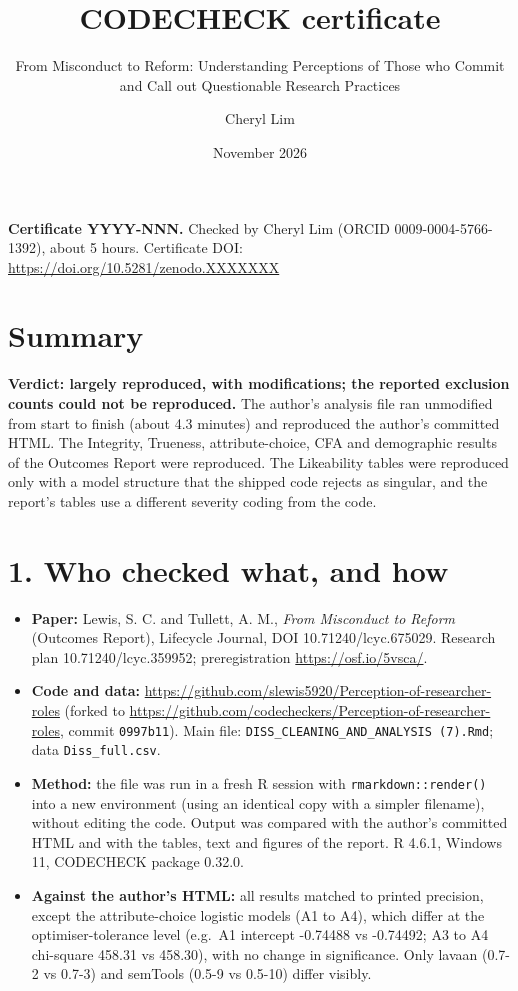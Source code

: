 \documentclass[
]{article}
\title{CODECHECK certificate}
\subtitle{From Misconduct to Reform: Understanding Perceptions of Those
who Commit and Call out Questionable Research Practices}
\author{Cheryl Lim}
\date{November 2026}
\providecommand{\tightlist}{%
  \setlength{\itemsep}{0pt}\setlength{\parskip}{0pt}}
\begin{document}
\maketitle

\textbf{Certificate YYYY-NNN.} Checked by Cheryl Lim (ORCID
0009-0004-5766-1392), about 5 hours. Certificate DOI:
\url{https://doi.org/10.5281/zenodo.XXXXXXX}

\section{Summary}\label{summary}

\textbf{Verdict: largely reproduced, with modifications; the reported
exclusion counts could not be reproduced.} The author's analysis file
ran unmodified from start to finish (about 4.3 minutes) and reproduced
the author's committed HTML. The Integrity, Trueness, attribute-choice,
CFA and demographic results of the Outcomes Report were reproduced. The
Likeability tables were reproduced only with a model structure that the
shipped code rejects as singular, and the report's tables use a
different severity coding from the code.

\section{1. Who checked what, and how}\label{who-checked-what-and-how}

\begin{itemize}
\tightlist
\item
  \textbf{Paper:} Lewis, S. C. and Tullett, A. M., \emph{From Misconduct
  to Reform} (Outcomes Report), Lifecycle Journal, DOI
  10.71240/lcyc.675029. Research plan 10.71240/lcyc.359952;
  preregistration \url{https://osf.io/5vsca/}.
\item
  \textbf{Code and data:}
  \url{https://github.com/slewis5920/Perception-of-researcher-roles}
  (forked to
  \url{https://github.com/codecheckers/Perception-of-researcher-roles},
  commit \texttt{0997b11}). Main file:
  \texttt{DISS\_CLEANING\_AND\_ANALYSIS\ (7).Rmd}; data
  \texttt{Diss\_full.csv}.
\item
  \textbf{Method:} the file was run in a fresh R session with
  \texttt{rmarkdown::render()} into a new environment (using an
  identical copy with a simpler filename), without editing the code.
  Output was compared with the author's committed HTML and with the
  tables, text and figures of the report. R 4.6.1, Windows 11, CODECHECK
  package 0.32.0.
\item
  \textbf{Against the author's HTML:} all results matched to printed
  precision, except the attribute-choice logistic models (A1 to A4),
  which differ at the optimiser-tolerance level (e.g.~A1 intercept
  -0.74488 vs -0.74492; A3 to A4 chi-square 458.31 vs 458.30), with no
  change in significance. Only lavaan (0.7-2 vs 0.7-3) and semTools
  (0.5-9 vs 0.5-10) differ visibly.
\end{itemize}
\end{document}
